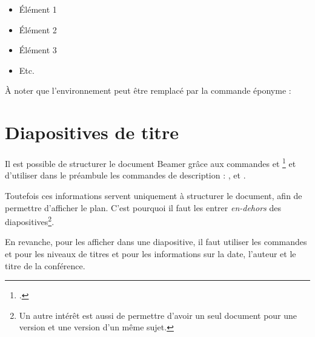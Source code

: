 \begin{latexcode}
\begin{frame}
	\begin{itemize}
		\item Élément 1
		\item Élément 2
		\item Élément 3
		\item Etc.
	\end{itemize}
\end{frame}
\end{latexcode}

À noter que l'environnement   peut être remplacé par la commande éponyme :

\begin{latexcode}
\end{latexcode}

\section{Diapositives de titre}

Il est possible de structurer le document Beamer grâce aux commandes  et \footcite[Le manuel de  déconseille d'utiliser   parce que \enquote{c'est le diable}. \\emph{Cf}. :][]{beamer_diable} et d'utiliser dans le préambule les commandes de description : ,  et .

Toutefois ces informations servent uniquement à structurer le document, afin de permettre d'afficher le plan. C'est pourquoi il faut les entrer \emph{en-dehors} des diapositives\footnote{Un  autre intérêt est aussi de permettre d'avoir un seul document pour une version  et une version  d'un même sujet.}.

En revanche, pour les afficher dans une diapositive, il faut utiliser les commandes  et  pour les niveaux de titres et  pour les informations sur la date, l'auteur et le titre de la conférence.

